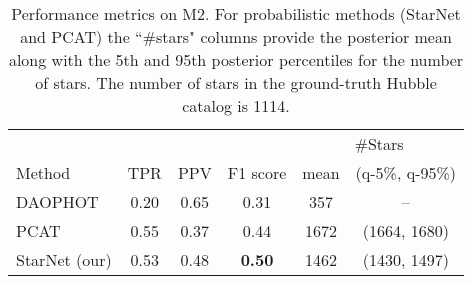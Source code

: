 
\begin{table}[!tb]
\centering
\begin{tabular}{l|ccc|cc}
\toprule
& & & & \multicolumn{2}{c}{\#Stars} \\
     Method &   TPR &   PPV &  F1 score &  mean & (q-5\%, q-95\%)\\
\midrule
    DAOPHOT &  0.20 &  0.65 &      0.31 &     357 & -- \\
       PCAT &  0.55 &  0.37 &      0.44 &    1672 & (1664, 1680)\\
 StarNet (our) &  0.53 &  0.48 &      \textbf{0.50} &    1462 & (1430, 1497)\\
\bottomrule
\end{tabular}
\caption{Performance metrics on M2.
For probabilistic methods (StarNet and PCAT)
the ``\#stars" columns provide the posterior mean along with the 5th and 95th posterior percentiles
for the number of stars.
The number of stars in the ground-truth Hubble catalog is 1114. }
\label{tab:summary_stats}
\end{table}
